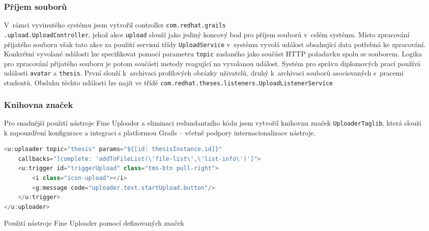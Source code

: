 \subsubsection{\textbf{Příjem souborů}}
V~rámci vyvinutého systému jsem vytvořil controller \texttt{com.redhat.grails\\.upload.UploadController}, jehož akce \texttt{upload} slouží jako jediný koncový bod pro příjem souborů v~celém systému. Místo zpracování přijatého souboru však tato akce za použití servisní třídy \texttt{UploadService} v~systému vyvolá událost obsahující data potřebná ke zpracování. Konkrétní vyvolané události lze specifikovat pomocí parametru \texttt{topic} zaslaného jako součást HTTP požadavku spolu se souborem. Logika pro zpracování přijatého souboru je potom součásti metody reagující na vyvolanou událost. Systém pro správu diplomových prací používá události \texttt{avatar} a \texttt{thesis}. První slouží k~archivaci profilových obrázky uživatelů, druhý k~archivaci souborů asociovaných s~pracemi studentů. Obsluhu těchto události lze najít ve třídě \texttt{com.redhat.theses.listeners.UploadListenerService}

\subsubsection{\textbf{Knihovna značek}}
Pro snadnější použití nástroje Fine Uploader a eliminaci redundantního kódu jsem vytvořil knihovnu značek \texttt{UploaderTaglib}, která slouží k zapouzdření konfigurace a integraci s platformou Grails -- včetně podpory internacionalizace nástroje.
\begin{example}
    \centering
    \begin{lstlisting}[language=Java]
<u:uploader topic="thesis" params="${[id: thesisInstance.id]}"
    callbacks="[complete: 'addToFileList(\'file-list\',\'list-info\')']">
    <u:trigger id="triggerUpload" class="tms-btn pull-right">
        <i class="icon-upload"></i>
        <g:message code="uploader.text.startUpload.button"/>
    </u:trigger>
</u:uploader>
    \end{lstlisting}
    \caption{Použití nástroje Fine Uploader pomocí definovaných značek}
\end{example}
